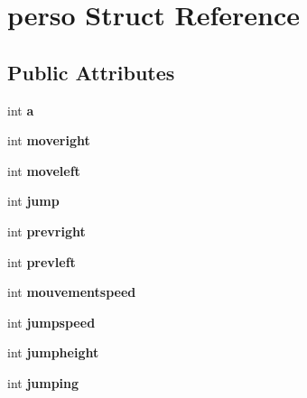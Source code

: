 \hypertarget{structperso}{}\section{perso Struct Reference}
\label{structperso}
\subsection*{Public Attributes}
\begin{DoxyCompactItemize}
\item 
\mbox{\label{structperso_afd06df60ee01ab1d69546cca298386d2}} 
int {\bfseries a}
\item 
\mbox{\label{structperso_a2569794976c704d114fe9dea3d7b4797}} 
int {\bfseries moveright}
\item 
\mbox{\label{structperso_af6a84f5fc4d6540d7e1f56275292b81c}} 
int {\bfseries moveleft}
\item 
\mbox{\label{structperso_a41362c60ce965d63463fb5fe4aefb519}} 
int {\bfseries jump}
\item 
\mbox{\label{structperso_af83844b050f098a44ed491b536e140cd}} 
int {\bfseries prevright}
\item 
\mbox{\label{structperso_a0c5758918ba19cc4f38bc7dd9f61a0a3}} 
int {\bfseries prevleft}
\item 
\mbox{\label{structperso_a6d1e8b799ba638f4bf05364670df4cd7}} 
int {\bfseries mouvementspeed}
\item 
\mbox{\label{structperso_ad01b3467bb28cbaec9bedf3dbe47f178}} 
int {\bfseries jumpspeed}
\item 
\mbox{\label{structperso_adb81af10565cac40aa2cf307251b2ac3}} 
int {\bfseries jumpheight}
\item 
\mbox{\label{structperso_a94c1ae51e29445aa83c6f447bfd36538}} 
int {\bfseries jumping}
\item 
\mbox{\label{structperso_a404e6c854a36af908254200e3803e9bb}} 

\end{DoxyCompactItemize}
